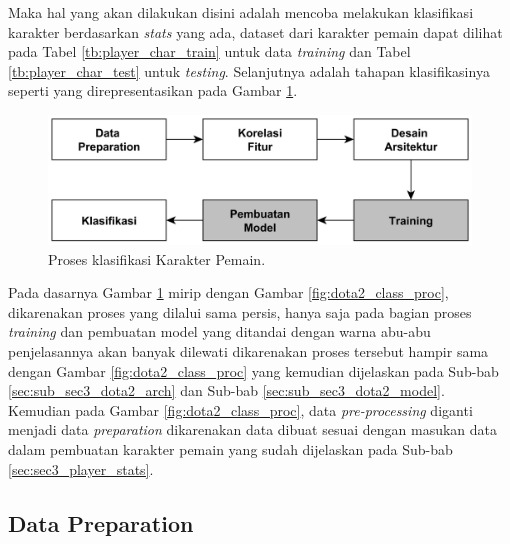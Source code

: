 Maka hal yang akan dilakukan disini adalah mencoba melakukan klasifikasi karakter berdasarkan \textit{stats} yang ada, dataset dari karakter pemain dapat dilihat pada Tabel \ref{tb:player_char_train} untuk data \textit{training} dan Tabel \ref{tb:player_char_test} untuk \textit{testing}. Selanjutnya adalah tahapan klasifikasinya seperti yang direpresentasikan pada Gambar \ref{fig:player_class_proc}. 
\vspace{1ex}

\begin{figure} [!h] \centering
	\includegraphics[scale=0.035]{img/player_char_nn_classification.png}
	\caption{Proses klasifikasi Karakter Pemain.}
	\label{fig:player_class_proc}
\end{figure}

Pada dasarnya Gambar \ref{fig:player_class_proc} mirip dengan Gambar \ref{fig:dota2_class_proc}, dikarenakan proses yang dilalui sama persis, hanya saja pada bagian proses \textit{training} dan pembuatan model yang ditandai dengan warna abu-abu penjelasannya akan banyak dilewati dikarenakan proses tersebut hampir sama dengan Gambar \ref{fig:dota2_class_proc} yang kemudian dijelaskan pada Sub-bab \ref{sec:sub_sec3_dota2_arch} dan Sub-bab \ref{sec:sub_sec3_dota2_model}. Kemudian pada Gambar \ref{fig:dota2_class_proc}, data \textit{pre-processing} diganti menjadi data \textit{preparation} dikarenakan data dibuat sesuai dengan masukan data dalam pembuatan karakter pemain yang sudah dijelaskan pada Sub-bab \ref{sec:sec3_player_stats}.
\vspace{1ex}

\subsection{Data Preparation}
\label{sec:sub_sec3_player_data_prep}
\vspace{1ex}

